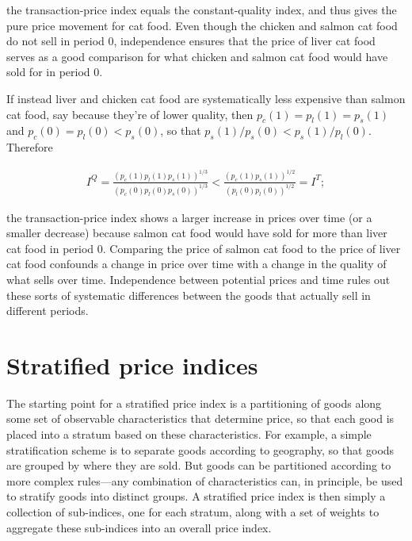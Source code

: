 \documentclass[]{article}
\begin{document}
the transaction-price index equals the constant-quality index, and thus gives the pure price movement for cat food. Even though the chicken and salmon cat food do not sell in period 0, independence ensures that the price of liver cat food serves as a good comparison for what chicken and salmon cat food would have sold for in period 0.

If instead liver and chicken cat food are systematically less expensive than salmon cat food, say because they're of lower quality, then \(p_{c}(1) = p_{l}(1) = p_{s}(1)\) and \(p_{c}(0) = p_{l}(0) < p_{s}(0)\), so that \(p_{s}(1) / p_{s}(0) < p_{s}(1) / p_{l}(0)\). Therefore

\begin{align*}
I^{Q} = \frac{(p_{c}(1) p_{l}(1) p_{s}(1))^{1 / 3}}{(p_{c}(0) p_{l}(0) p_{s}(0))^{1 / 3}} < \frac{(p_{c}(1) p_{s}(1))^{1 / 2}}{(p_{l}(0) p_{l}(0))^{1 / 2}} = I^{T};
\end{align*}

the transaction-price index shows a larger increase in prices over time (or a smaller decrease) because salmon cat food would have sold for more than liver cat food in period 0. Comparing the price of salmon cat food to the price of liver cat food confounds a change in price over time with a change in the quality of what sells over time. Independence between potential prices and time rules out these sorts of systematic differences between the goods that actually sell in different periods.

\hypertarget{stratified-price-indices}{%
\section{Stratified price indices}\label{stratified-price-indices}}

The starting point for a stratified price index is a partitioning of goods along some set of observable characteristics that determine price, so that each good is placed into a stratum based on these characteristics. For example, a simple stratification scheme is to separate goods according to geography, so that goods are grouped by where they are sold. But goods can be partitioned according to more complex rules---any combination of characteristics can, in principle, be used to stratify goods into distinct groups. A stratified price index is then simply a collection of sub-indices, one for each stratum, along with a set of weights to aggregate these sub-indices into an overall price index.
\end{document}
